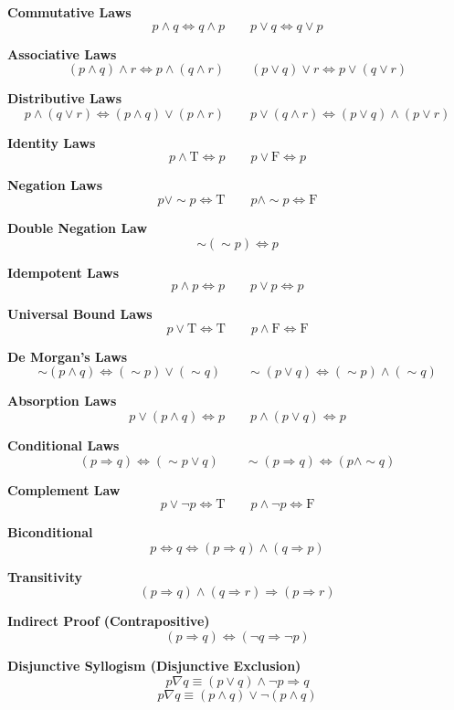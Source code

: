 \textbf{Commutative Laws}
\[
	p \land q \Leftrightarrow q \land p \qquad p \lor q \Leftrightarrow q \lor p
\]

\textbf{Associative Laws}
\[
	(p \land q) \land r \Leftrightarrow p \land (q \land r) \qquad (p \lor q) \lor r \Leftrightarrow p \lor (q \lor r)
\]

\textbf{Distributive Laws}
\[
	p \land (q \lor r) \Leftrightarrow (p \land q) \lor (p \land r) \qquad
	p \lor (q \land r) \Leftrightarrow (p \lor q) \land (p \lor r)
\]

\textbf{Identity Laws}
\[
	p \land \text{T} \Leftrightarrow p \qquad p \lor \text{F} \Leftrightarrow p
\]

\textbf{Negation Laws}
\[
	p \lor \sim p \Leftrightarrow \text{T} \qquad p \land \sim p \Leftrightarrow \text{F}
\]

\textbf{Double Negation Law}
\[
	\sim(\sim p) \Leftrightarrow p
\]

\textbf{Idempotent Laws}
\[
	p \land p \Leftrightarrow p \qquad p \lor p \Leftrightarrow p
\]

\textbf{Universal Bound Laws}
\[
	p \lor \text{T} \Leftrightarrow \text{T} \qquad p \land \text{F} \Leftrightarrow \text{F}
\]

\textbf{De Morgan’s Laws}
\[
	\sim (p \land q) \Leftrightarrow (\sim p) \lor (\sim q) \qquad
	\sim (p \lor q) \Leftrightarrow (\sim p) \land (\sim q)
\]

\textbf{Absorption Laws}
\[
	p \lor (p \land q) \Leftrightarrow p \qquad p \land (p \lor q) \Leftrightarrow p
\]

\textbf{Conditional Laws}
\[
	(p \Rightarrow q) \Leftrightarrow (\sim p \lor q) \qquad \sim(p \Rightarrow q) \Leftrightarrow (p \land \sim q)
\]

\textbf{Complement Law}
\[
	p \lor \neg p \Leftrightarrow \text{T} \qquad p \land \neg p \Leftrightarrow \text{F}
\]

\textbf{Biconditional}
\[
	p \Leftrightarrow q \Leftrightarrow (p \Rightarrow q) \land (q \Rightarrow p)
\]

\textbf{Transitivity}
\[
	(p \Rightarrow q) \land (q \Rightarrow r) \Rightarrow (p \Rightarrow r)
\]

\textbf{Indirect Proof (Contrapositive)}
\[
	(p \Rightarrow q) \Leftrightarrow (\neg q \Rightarrow \neg p)
\]

\textbf{Disjunctive Syllogism (Disjunctive Exclusion)}
\[
	p \nabla q \equiv (p \lor q) \land \neg p \Rightarrow q
\]
\[
	p \nabla q \equiv(p \land q) \lor \neg  (p \land q)
\]


